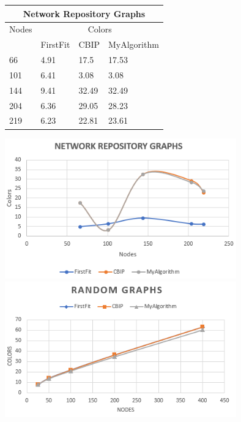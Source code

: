 \documentclass{article}
\begin{document}
\begin{center}
 \begin{tabular}{||p{2cm} | p{2cm} | p{2cm} | p{2cm} ||} 
\hline
\multicolumn{4}{|c|}{Network Repository Graphs} \\

 \hline
\hline
 Nodes & \multicolumn{3}{|c|}{Colors} \\
\hline
  & FirstFit & CBIP & MyAlgorithm \\ [0.5ex] 
 \hline\hline
 66 & 4.91 & 17.5 & 17.53 \\ 
 \hline
 101 & 6.41 & 3.08 & 3.08 \\
 \hline
 144 & 9.41 & 32.49 & 32.49 \\
 \hline
 204 & 6.36 & 29.05 & 28.23 \\
 \hline
 219 & 6.23 & 22.81 & 23.61\\ [1ex] 
 \hline
\end{tabular}
\end{center}




\includegraphics[width=0.75\textwidth]{NetworkRepoGraph}
\bigbreak
\includegraphics[width=0.75\textwidth]{RandomGraph}
\end{document}
